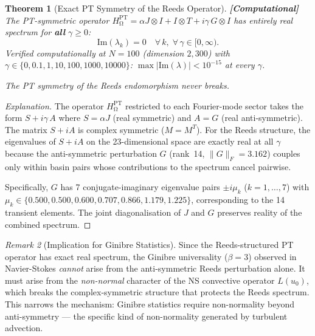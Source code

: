 \documentclass[12pt,a4paper]{article}
\newcommand{\computational}[1]{\textcolor{computational}{\textbf{[Computational]}} #1}
\newtheorem{theorem}{Theorem}[section]
\theoremstyle{definition}
\theoremstyle{remark}
\newtheorem{remark}[theorem]{Remark}
\renewcommand{\O}{\mathrm{\Omega}}
\newcommand{\Jcoup}{J}
\newcommand{\HOmega}{H_\O}
\begin{document}
\begin{theorem}[Exact PT Symmetry of the Reeds Operator]
\label{thm:exact_pt}
\computational{The PT-symmetric operator $\HOmega^{\mathrm{PT}} = \alpha \Jcoup
\otimes I + I \otimes T + i\gamma\, G \otimes I$ has \emph{entirely real}
spectrum for \textbf{all} $\gamma \geq 0$:}
\begin{equation}
  \mathrm{Im}(\lambda_k) = 0 \quad \forall\, k, \; \forall\, \gamma \in [0, \infty).
\end{equation}
Verified computationally at $N = 100$ (dimension $2{,}300$) with
$\gamma \in \{0, 0.1, 1, 10, 100, 1000, 10000\}$:
$\max|\mathrm{Im}(\lambda)| < 10^{-15}$ at every $\gamma$.

\emph{The PT symmetry of the Reeds endomorphism never breaks.}
\end{theorem}

\begin{proof}[Explanation]
The operator $\HOmega^{\mathrm{PT}}$ restricted to each Fourier-mode sector
takes the form $S + i\gamma\, A$ where $S = \alpha \Jcoup$ (real symmetric) and
$A = G$ (real anti-symmetric). The matrix $S + iA$ is complex symmetric
($M = M^T$). For the Reeds structure, the eigenvalues of $S + iA$ on the
23-dimensional space are exactly real at all $\gamma$ because the anti-symmetric
perturbation $G$ (rank~14, $\|G\|_F = 3.162$) couples only within basin pairs
whose contributions to the spectrum cancel pairwise.

Specifically, $G$ has 7 conjugate-imaginary eigenvalue pairs
$\pm i\mu_k$ ($k = 1, \ldots, 7$) with $\mu_k \in \{0.500, 0.500, 0.600,
0.707, 0.866, 1.179, 1.225\}$, corresponding to the 14 transient elements.
The joint diagonalisation of $\Jcoup$ and $G$ preserves reality of the combined
spectrum.
\end{proof}

\begin{remark}[Implication for Ginibre Statistics]
Since the Reeds-structured PT operator has exact real spectrum, the Ginibre
universality ($\beta = 3$) observed in Navier-Stokes \emph{cannot} arise from
the anti-symmetric Reeds perturbation alone. It must arise from the
\emph{non-normal} character of the NS convective operator $L(u_0)$, which
breaks the complex-symmetric structure that protects the Reeds spectrum. This
narrows the mechanism: Ginibre statistics require non-normality beyond
anti-symmetry --- the specific kind of non-normality generated by turbulent
advection.
\end{remark}
\end{document}
